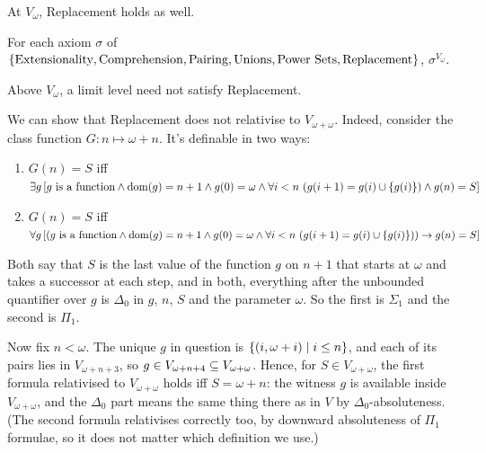 At $V_{\omega}$, Replacement holds as well.

\begin{boxproposition}
    For each axiom $\sigma$ of $\left\{ \text{Extensionality}, \text{Comprehension}, \text{Pairing}, \text{Unions}, \text{Power Sets}, \text{Replacement} \right\}$, $\sigma^{V_{\omega}}$.
\end{boxproposition}

Above $V_{\omega}$, a limit level need not satisfy Replacement.

\begin{boxnexample}
    We can show that Replacement does not relativise to $V_{\omega + \omega}$. Indeed, consider the class function $G : n \mapsto \omega + n$. It's definable in two ways:
    \begin{enumerate}
        \item $G(n) = S$ iff $\exists g \left[ g \text{ is a function} \land \operatorname{dom}\!\left( g \right) = n + 1 \land g(0) = \omega \land \forall i < n \, \left( g(i + 1) = g(i) \cup \left\{ g(i) \right\} \right) \land g(n) = S \right]$
        \item $G(n) = S$ iff $\forall g \left[ \left( g \text{ is a function} \land \operatorname{dom}\!\left( g \right) = n + 1 \land g(0) = \omega \land \forall i < n \, \left( g(i + 1) = g(i) \cup \left\{ g(i) \right\} \right) \right) \to g(n) = S \right]$
    \end{enumerate}
    Both say that $S$ is the last value of the function $g$ on $n + 1$ that starts at $\omega$ and takes a successor at each step, and in both, everything after the unbounded quantifier over $g$ is $\Delta_0$ in $g$, $n$, $S$ and the parameter $\omega$. So the first is $\Sigma_1$ and the second is $\Pi_1$.

    Now fix $n < \omega$. The unique $g$ in question is $\left\{ \left( i, \omega + i \right) \; \middle\vert \; i \leq n \right\}$, and each of its pairs lies in $V_{\omega + n + 3}$, so $g \in V_{\omega + n + 4} \subseteq V_{\omega + \omega}$. Hence, for $S \in V_{\omega + \omega}$, the first formula relativised to $V_{\omega + \omega}$ holds iff $S = \omega + n$: the witness $g$ is available inside $V_{\omega + \omega}$, and the $\Delta_0$ part means the same thing there as in $V$ by $\Delta_0$-absoluteness. (The second formula relativises correctly too, by downward absoluteness of $\Pi_1$ formulae, so it does not matter which definition we use.)


\end{boxnexample}
